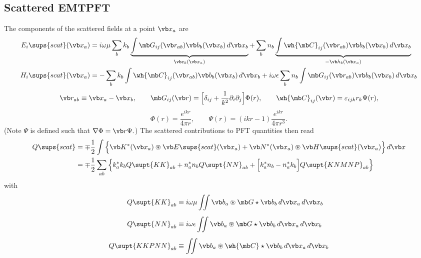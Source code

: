 \subsection{Scattered EMTPFT}

The components of the scattered fields at a point $\vb x_a$ are
\begin{align*}
 E_i\sups{scat}(\vb x_a)
 &= i\omega \mu \sum_b k_b 
    \underbrace{\int \mb G_{ij}(\vb r_{ab})\vb b_b(\vb x_b)\,d\vb x_b}_{\vb e_b(\vb x_a)}
   +\sum_b n_b 
    \underbrace{\int \wh{\mb C}_{ij}(\vb r_{ab})\vb b_b(\vb x_b)\,d\vb x_b}_{-\vb h_b(\vb x_a)}
\\
 H_i\sups{scat}(\vb x_a)
 &= -\sum_b k_b \int \wh{\mb C}_{ij}(\vb r_{ab})\vb b_b(\vb x_b)\,d\vb x_b
    +i\omega \epsilon \sum_b n_b \int \mb G_{ij}(\vb r_{ab})\vb b_b(\vb x_b)\,d\vb x_b
\end{align*}
$$\vb r_{ab} \equiv \vb x_a - \vb x_b, 
  \qquad
  \mb G_{ij}(\vb r) 
   = \Big[ \delta_{ij} + \frac{1}{k^2}\partial_i\partial_j\Big]\Phi(r),
  \qquad
  \wh{\mb C}_{ij}(\vb r) = \varepsilon_{ijk} r_k \Psi(r), 
$$
$$ \Phi(r) = \frac{e^{ikr}}{4\pi r}, 
   \qquad 
   \Psi(r) = (ikr-1)\frac{e^{ikr}}{4\pi r^3}.
$$
(Note $\Psi$ is defined such that $\nabla \Phi=\vb r\Psi.$)
The scattered contributions to PFT quantities then read
\begin{align*}
Q\sups{scat}
&= \mp\frac{1}{2}
   \int\Big\{
    \vb K^*(\vb x_a) \circledast \vb E\sups{scat}(\vb x_a)
  + \vb N^*(\vb x_a) \circledast \vb H\sups{scat}(\vb x_a)
      \Big\} \, d\vb x
\\
&=\mp \frac{1}{2}
  \sum_{ab} \Big\{  k_a^* k_b Q\supt{KK}_{ab}
                   + n_a^* n_b Q\supt{NN}_{ab}
                   +\Big[k_a^* n_b - n_a^* k_b\Big] Q\supt{KNMNP}_{ab}
            \Big\}
\end{align*}
with
\begin{align*}
Q\supt{KK}_{ab} 
 &\equiv i\omega \mu \iint \vb b_a \circledast \mb G \star \vb b_b \, d\vb x_a \, d\vb x_b
\\[5pt]
Q\supt{NN}_{ab} 
 &\equiv i\omega \epsilon \iint \vb b_a \circledast \mb G \star \vb b_b \, d\vb x_a \, d\vb x_b
\\[5pt]
Q\supt{KKPNN}_{ab} 
 &\equiv \iint \vb b_a \circledast \wh{\mb C} \star \vb b_b \, d\vb x_a \, d\vb x_b
\\[5pt]
\end{align*}

